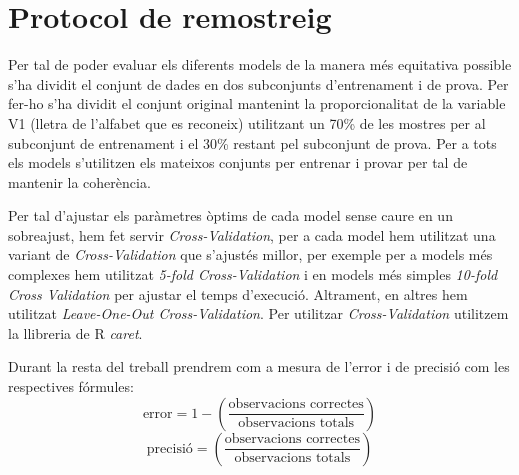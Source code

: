 \section{Protocol de remostreig}\label{prepros}
Per tal de poder evaluar els diferents models de la manera més equitativa possible s'ha dividit el conjunt de dades en dos subconjunts d'entrenament i de prova. Per fer-ho s'ha dividit el conjunt original mantenint la proporcionalitat de la variable V1 (lletra de l'alfabet que es reconeix) utilitzant un 70\% de les mostres per al subconjunt de entrenament i el 30\% restant pel subconjunt de prova. Per a tots els models s'utilitzen els mateixos conjunts per entrenar i provar per tal de mantenir la coherència.

Per tal d'ajustar els paràmetres òptims de cada model sense caure en un sobreajust, hem fet servir \textit{Cross-Validation}, per a cada model hem utilitzat una variant de \textit{Cross-Validation} que s'ajustés millor, per exemple per a models més complexes hem utilitzat \textit{5-fold Cross-Validation} i en models més simples \textit{10-fold Cross Validation} per ajustar el temps d'execució. Altrament, en altres hem utilitzat \textit{Leave-One-Out Cross-Validation}. Per utilitzar \textit{Cross-Validation} utilitzem la llibreria de R \textit{caret}.
\cite{caretlibrary}

Durant la resta del treball prendrem com a mesura de l'error i de precisió com les respectives fórmules:
\[\text{error} = 1 -(\frac{\text{observacions correctes}}{\text{observacions totals}})\]
\[\text{precisió} = (\frac{\text{observacions correctes}}{\text{observacions totals}})\]
